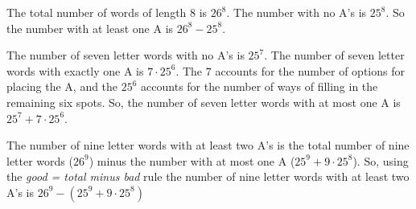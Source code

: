 \begin{Solution}{28.8}

The total number of words of length $8$ is $26^8$. The number with no A's is $25^8$.
So the number with at least one A is $26^8 - 25^8$.

\end{Solution}

\begin{Solution}{28.9}

The number of seven letter words with no A's is $25^7$. The number of seven letter words with exactly one A is
$7\cdot 25^6$. The $7$ accounts for the number of options for placing the A, and the $25^6$ accounts for the number of ways of filling in the remaining six spots. So, the number of seven letter words with at most one A is
$25^7+ 7\cdot 25^6$. 

\end{Solution}

\begin{Solution}{28.10}

The number of nine letter words with at least two A's is the total number of nine letter words ($26^9$) minus the number with at most one A ($25^9 + 9\cdot 25^8$). So, using the {\it good = total minus bad} rule the number of nine letter words with at least two A's is $26^9 -(25^9 + 9\cdot 25^8)$

\end{Solution}
